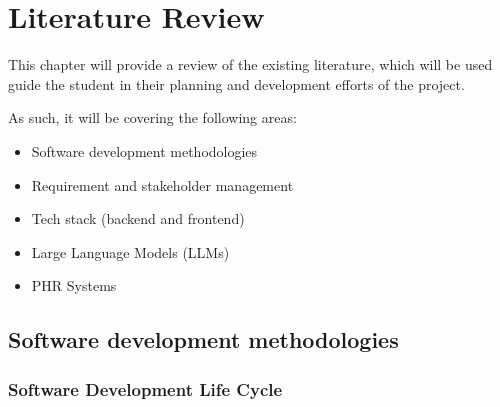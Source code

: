 \chapter{Literature Review}

This chapter will provide a review of the existing literature, which will be used guide the student in their planning and development efforts of the project.

\noindent As such, it will be covering the following areas:
\begin{itemize}
    \item Software development methodologies
    \item Requirement and stakeholder management
    \item Tech stack (backend and frontend)
    \item Large Language Models (LLMs)
    \item PHR Systems
\end{itemize}

\section{Software development methodologies}\label{sec:methodologies}

\subsection{Software Development Life Cycle}

